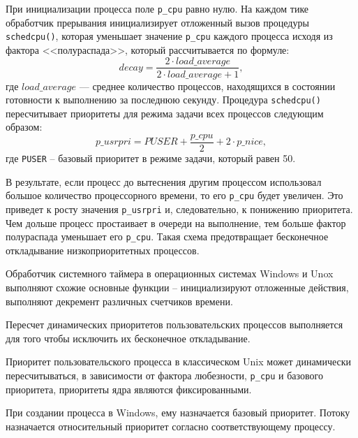 При инициализации процесса поле \texttt{p\_cpu} равно нулю. На каждом тике обработчик прерывания инициализирует отложенный вы­зов процедуры \texttt{schedcpu()}, которая уменьшает значение \texttt{p\_cpu} каждого процесса
исходя из фактора <<полураспада>>, который рассчитывается по формуле:
\begin{equation}
	decay = \frac{2 \cdot load\_average}{2 \cdot load\_average + 1},
\end{equation}
где $load\_average$ --- среднее количество процессов, находящихся в состоянии готовности к выполнению за последнюю секунду. 
Процедура \texttt{schedcpu()} пересчитывает приоритеты для режима задачи всех процессов следующим образом:
\begin{equation}
	p\_usrpri = PUSER + \frac{p\_cpu}{2} + 2 \cdot p\_nice,
\end{equation}
где \texttt{PUSER} -- базовый приоритет в режиме задачи, который равен 50.

В результате, если процесс до вытеснения другим процессом использовал большое количество процессорного времени, то его \texttt{p\_cpu} будет увеличен. Это приведет к росту значения \texttt{p\_usrpri} и, следовательно, к понижению приоритета. Чем дольше процесс простаивает в очереди на выполнение, тем больше фактор полураспада уменьшает его \texttt{p\_cpu}. Такая схема предотвращает бесконечное откладывание низкоприоритетных процессов. 


Обработчик системного таймера в операционных системах Windows и Unox выполняют схожие основные функции -- инициализируют отложенные действия, выполняют декремент различных счетчиков времени.

Пересчет динамических приоритетов пользовательских процессов выполняется для того чтобы исключить их бесконечное откладывание.

Приоритет пользовательского процесса в классическом Unix может динамически пересчитываться, в зависимости от фактора любезности, \texttt{p\_cpu} и базового приоритета, приоритеты ядра являются фиксированными. 

При создании процесса в Windows, ему назначается базовый приоритет. Потоку назначается относительный приоритет согласно соответствующему процессу. 
